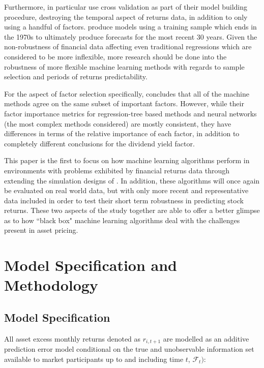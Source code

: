 \documentclass[11pt, a4paper, table]{article}
\begin{document}
Furthermore, \cite{feng_deep_2018} in particular use cross validation as part of their model building procedure, destroying the temporal aspect of returns data, in addition to only using a handful of factors. \cite{gu_empirical_2018} produce models using a training sample which ends in the 1970s to ultimately produce forecasts for the most recent 30 years. Given the non-robustness of financial data affecting even traditional regressions which are considered to be more inflexible, more research should be done into the robustness of more flexible machine learning methods with regards to sample selection and periods of returns predictability.

For the aspect of factor selection specifically, \cite{gu_empirical_2018} concludes that all of the machine methods agree on the same subset of important factors. However, while their factor importance metrics for regression-tree based methods and neural networks (the most complex methods considered) are mostly consistent, they have differences in terms of the relative importance of each factor, in addition to completely different conclusions for the dividend yield factor.

This paper is the first to focus on how machine learning algorithms perform in environments with problems exhibited by financial returns data through extending the simulation designs of \cite{gu_empirical_2018}. In addition, these algorithms will once again be evaluated on real world data, but with only more recent and representative data included in order to test their short term robustness in predicting stock returns. These two aspects of the study together are able to offer a better glimpse as to how ``black box" machine learning algorithms deal with the challenges present in asset pricing.


\section{Model Specification and Methodology}

\subsection{Model Specification}

All asset excess monthly returns denoted as $r_{i, t+1}$ are modelled as an additive prediction error model conditional on the true and unobservable information set available to market participants up to and including time $t$, $\mathcal{F}_t)$:
\end{document}
